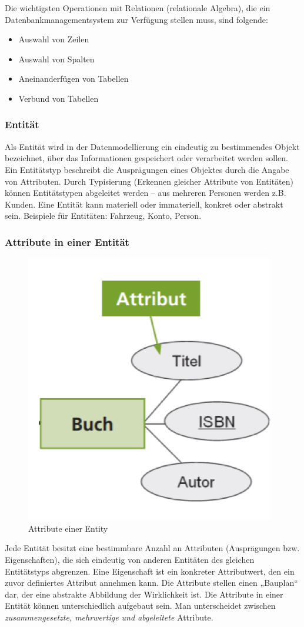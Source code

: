 Die wichtigsten Operationen mit Relationen (relationale Algebra), die ein Datenbankmanagementsystem zur Verfügung stellen muss, sind folgende:

\begin{itemize}
    \item Auswahl von Zeilen
    \item Auswahl von Spalten
    \item Aneinanderfügen von Tabellen
    \item Verbund von Tabellen
\end{itemize}

\subsubsection{Entität}

Als Entität wird in der Datenmodellierung ein eindeutig zu bestimmendes Objekt bezeichnet, über das Informationen gespeichert oder verarbeitet werden sollen. Ein Entitätstyp beschreibt die Ausprägungen eines Objektes durch die Angabe von Attributen. Durch Typisierung (Erkennen gleicher Attribute von Entitäten) können Entitätstypen abgeleitet werden – aus mehreren Personen werden z.B. Kunden. Eine Entität kann materiell oder immateriell, konkret oder abstrakt sein. Beispiele für Entitäten: Fahrzeug, Konto, Person.

\subsubsection{Attribute in einer Entität}

\begin{figure}
    \begin{center}
        \includegraphics[width=.28\textwidth]{Content/images/modellierung/entity.png}
    \end{center}
    \caption{Attribute einer Entity}
    \label{fig:modellierung:entity}
\end{figure}
Jede Entität besitzt eine bestimmbare Anzahl an Attributen (Ausprägungen bzw. Eigenschaften), die sich eindeutig von anderen Entitäten des gleichen Entitätstyps abgrenzen. Eine Eigenschaft ist ein konkreter Attributwert, den ein zuvor definiertes Attribut annehmen kann. Die Attribute stellen einen „Bauplan“ dar, der eine abstrakte Abbildung der Wirklichkeit ist.
 Die Attribute in einer Entität können unterschiedlich aufgebaut sein. Man unterscheidet zwischen \emph{zusammengesetzte, mehrwertige und abgeleitete} Attribute.

